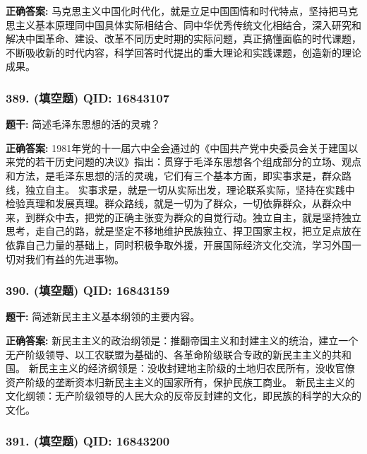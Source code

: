 \documentclass[12pt,UTF8]{ctexart}
\begin{document}
\textbf{正确答案:}
马克思主义中国化时代化，就是立足中国国情和时代特点，坚持把马克思主义基本原理同中国具体实际相结合、同中华优秀传统文化相结合，深入研究和解决中国革命、建设、改革不同历史时期的实际问题，真正搞懂面临的时代课题，不断吸收新的时代内容，科学回答时代提出的重大理论和实践课题，创造新的理论成果。

\vspace{0.3em}\hrulefill\vspace{0.7em}

\subsubsection*{389. (填空题) \small QID: 16843107}

\textbf{题干:}
简述毛泽东思想的活的灵魂？

\textbf{正确答案:}
1981年党的十一届六中全会通过的《中国共产党中央委员会关于建国以来党的若干历史问题的决议》指出：贯穿于毛泽东思想各个组成部分的立场、观点和方法，是毛泽东思想的活的灵魂，它们有三个基本方面，即实事求是，群众路线，独立自主。
实事求是，就是一切从实际出发，理论联系实际，坚持在实践中检验真理和发展真理。群众路线，就是一切为了群众，一切依靠群众，从群众中来，到群众中去，把党的正确主张变为群众的自觉行动。独立自主，就是坚持独立思考，走自己的路，就是坚定不移地维护民族独立、捍卫国家主权，把立足点放在依靠自己力量的基础上，同时积极争取外援，开展国际经济文化交流，学习外国一切对我们有益的先进事物。

\vspace{0.3em}\hrulefill\vspace{0.7em}

\subsubsection*{390. (填空题) \small QID: 16843159}

\textbf{题干:}
简述新民主主义基本纲领的主要内容。

\textbf{正确答案:}
新民主主义的政治纲领是：推翻帝国主义和封建主义的统治，建立一个无产阶级领导、以工农联盟为基础的、各革命阶级联合专政的新民主主义的共和国。
新民主主义的经济纲领是：没收封建地主阶级的土地归农民所有，没收官僚资产阶级的垄断资本归新民主主义的国家所有，保护民族工商业。
新民主主义的文化纲领：无产阶级领导的人民大众的反帝反封建的文化，即民族的科学的大众的文化。

\vspace{0.3em}\hrulefill\vspace{0.7em}

\subsubsection*{391. (填空题) \small QID: 16843200}
\end{document}
